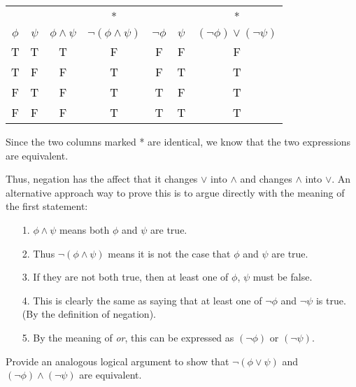 \documentclass[13.5pt]{article}
\begin{document}
\begin{enumerate}
\begin{center}
\begin{tabular}{ c c c c c c c}
& & & {*} & & & {*}\\
 \(\phi\) & \(\psi\) & \(\phi \wedge \psi\) & \(\neg (\phi \wedge \psi)\) & \(\neg \phi\) & \(\psi\) & \((\neg \phi) \vee (\neg \psi)\) \\ 
\hline
 \textcolor{black}{T} & \textcolor{black}{T} & \textcolor{black}{T} & \textcolor{black}{F} & \textcolor{black}{F} & \textcolor{black}{F} & \textcolor{black}{F} \\ 
 \textcolor{black}{T} & \textcolor{black}{F} & \textcolor{black}{F} & \textcolor{black}{T} & \textcolor{black}{F} & \textcolor{black}{T} & \textcolor{black}{T} \\ 
 \textcolor{black}{F} & \textcolor{black}{T} & \textcolor{black}{F} & \textcolor{black}{T} & \textcolor{black}{T} & \textcolor{black}{F} & \textcolor{black}{T}\\ 
 \textcolor{black}{F} & \textcolor{black}{F} & \textcolor{black}{F} & \textcolor{black}{T} & \textcolor{black}{T} & \textcolor{black}{T} & \textcolor{black}{T} 
\end{tabular}
\end{center}

{Since the two columns marked * are identical, we know that the two expressions are equivalent.\

Thus, negation has the affect that it changes \(\vee\) into \(\wedge\) and changes \(\wedge\) into \(\vee\). An alternative approach way to prove this is to argue directly with the meaning of the first statement:}

\begin{enumerate}
\setlength{\itemindent}{.1in}
\item[1.] \(\phi \wedge \psi\) means both \(\phi\) and \(\psi\) are true.
\item[2.] Thus \(\neg (\phi \wedge \psi)\) means it is not the case that \(\phi\) and \(\psi\) are true.
\item[3.] If they are not both true, then at least one of \(\phi\), \(\psi\) must be false.
\item[4.] This is clearly the same as saying that at least one of \(\neg \phi\) and \(\neg \psi\) is true. (By the definition of negation). 
\item[5.] By the meaning of \textit{or}, this can be expressed as \((\neg \phi)\) or \((\neg \psi)\).
\end{enumerate}

{Provide an analogous logical argument to show that \(\neg (\phi \vee \psi)\) and \((\neg \phi) \wedge (\neg \psi)\) are equivalent.


}
\end{enumerate}
\end{document}
